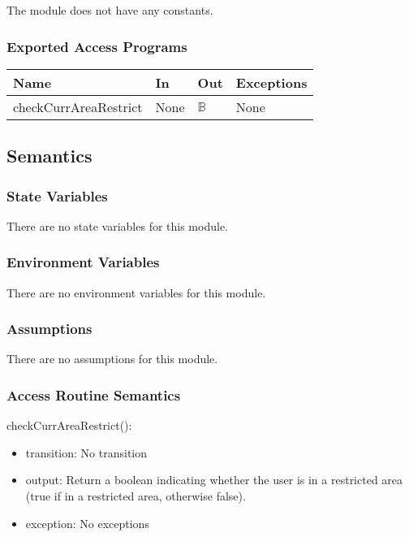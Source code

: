 \documentclass[12pt, titlepage]{article}
\begin{document}
The module does not have any constants.

\subsubsection{Exported Access Programs}

\begin{center}
  \begin{tabular}{p{5cm} p{2cm} p{2cm} p{3cm}}
    \hline
    \textbf{Name} & \textbf{In} & \textbf{Out} & \textbf{Exceptions} \\
    \hline
    checkCurrAreaRestrict & None & $\mathbb{B}$ & None \\
    \hline
\end{tabular}
\end{center}

\subsection{Semantics}

\subsubsection{State Variables}

There are no state variables for this module.

\subsubsection{Environment Variables}

There are no environment variables for this module.

\subsubsection{Assumptions}

There are no assumptions for this module.

\subsubsection{Access Routine Semantics}

\noindent checkCurrAreaRestrict():
\begin{itemize}
\item transition: No transition
\item output: Return a boolean indicating whether the user is in a restricted area (true if in a restricted area, otherwise false).
\item exception: No exceptions
\end{itemize}
\end{document}
